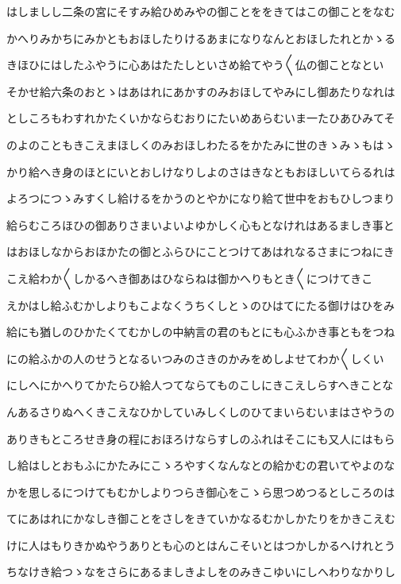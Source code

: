 \documentclass[a4paper,11pt,landscape]{ltjtarticle}
\begin{document}
はしましし二条の宮にそすみ給ひめみやの御ことををきてはこの御ことをなむ
\par\medskip
かへりみかちにみかともおほしたりけるあまになりなんとおほしたれとかゝる
\par\medskip
きほひにはしたふやうに心あはたたしといさめ給てやう〱仏の御ことなとい
\par\medskip
そかせ給六条のおとゝはあはれにあかすのみおほしてやみにし御あたりなれは
\par\medskip
としころもわすれかたくいかならむおりにたいめあらむいま一たひあひみてそ
\par\medskip
のよのこともきこえまほしくのみおほしわたるをかたみに世のきゝみゝもはゝ
\par\medskip
かり給へき身のほとにいとおしけなりしよのさはきなともおほしいてらるれは
\par\medskip
よろつにつゝみすくし給けるをかうのとやかになり給て世中をおもひしつまり
\par\medskip
給らむころほひの御ありさまいよいよゆかしく心もとなけれはあるましき事と
\par\medskip
はおほしなからおほかたの御とふらひにことつけてあはれなるさまにつねにき
\par\medskip
こえ給わか〱しかるへき御あはひならねは御かへりもとき〱につけてきこ
\par\medskip
えかはし給ふむかしよりもこよなくうちくしとゝのひはてにたる御けはひをみ
\par\medskip
給にも猶しのひかたくてむかしの中納言の君のもとにも心ふかき事ともをつね
\par\medskip
にの給ふかの人のせうとなるいつみのさきのかみをめしよせてわか〱しくい
\par\medskip
にしへにかへりてかたらひ給人つてならてものこしにきこえしらすへきことな
\par\medskip
んあるさりぬへくきこえなひかしていみしくしのひてまいらむいまはさやうの
\par\medskip
ありきもところせき身の程におほろけならすしのふれはそこにも又人にはもら
\par\medskip
し給はしとおもふにかたみにこゝろやすくなんなとの給かむの君いてやよのな
\par\medskip
かを思しるにつけてもむかしよりつらき御心をこゝら思つめつるとしころのは
\par\medskip
てにあはれにかなしき御ことをさしをきていかなるむかしかたりをかきこえむ
\par\medskip
けに人はもりきかぬやうありとも心のとはんこそいとはつかしかるへけれとう
\par\medskip
ちなけき給つゝなをさらにあるましきよしをのみきこゆいにしへわりなかりし
\end{document}
